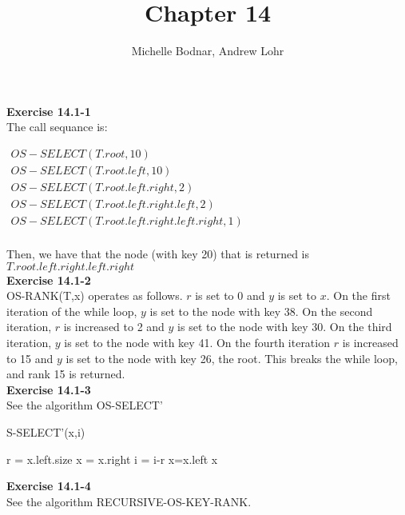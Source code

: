\documentclass{article}
\title{Chapter 14}
\author{Michelle Bodnar, Andrew Lohr}
\begin{document}
\maketitle

\noindent\textbf{ Exercise 14.1-1} \\

The call sequance is:

$
\begin{array}{l}
OS-SELECT(T.root,10)\\
OS-SELECT(T.root.left,10)\\
OS-SELECT(T.root.left.right,2)\\
OS-SELECT(T.root.left.right.left,2)\\
OS-SELECT(T.root.left.right.left.right,1)\\
\end{array}
$

Then, we have that the node (with key 20) that is returned is $T.root.left.right.left.right$ \\

\noindent\textbf{Exercise 14.1-2}\\

OS-RANK(T,x) operates as follows.  $r$ is set to 0 and $y$ is set to $x$.  On the first iteration of the while loop, $y$ is set to the node with key 38.  On the second iteration, $r$ is increased to 2 and $y$ is set to the node with key 30.  On the third iteration, $y$ is set to the node with key 41.  On the fourth iteration $r$ is increased to 15 and $y$ is set to the node with key 26, the root.  This breaks the while loop, and rank 15 is returned. \\


\noindent\textbf{ Exercise 14.1-3} \\

See the algorithm OS-SELECT'
\begin{algorithm}
\caption OS-SELECT'(x,i)
\begin{algorithmic}
\State r = x.left.size
\State x = x.right
\State i = i-r
\Else
\State x=x.left
\EndIf
{}
\EndWhile
\State \Return x
\end{algorithmic}
\end{algorithm}

\noindent\textbf{Exercise 14.1-4}\\

See the algorithm RECURSIVE-OS-KEY-RANK.\\
\end{document}
